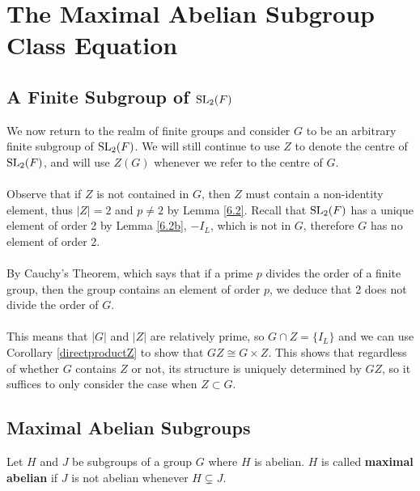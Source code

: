 \chapter[The Maximal Abelian Subgroup Class Equation]{The Maximal Abelian Subgroup Class Equation}\label{Ch6_MaximalAbelianSubgroupClassEquation}

\section[A finite subgroup of $\SL_2(F)$]{A Finite Subgroup of $\SL_2(F)$}

We now return to the realm of finite groups and consider $G$ to be an arbitrary finite subgroup of $\SL_2(F)$. We will still continue to use $Z$ to denote the centre of $\SL_2(F)$, and will use $Z(G)$ whenever we refer to the centre of $G$. \\
\\
Observe that if $Z$ is not contained in $G$, then $Z$ must contain a non-identity element, thus $|Z| = 2$ and $p \neq 2$ by Lemma \ref{6.2}. Recall that $\SL_2(F)$ has a unique element of order 2 by Lemma \ref{6.2b}, $- I_L$, which is not in $G$, therefore $G$ has no element of order 2. \\
\\
By Cauchy's Theorem, which says that if a prime $p$ divides the order of a finite group, then the group contains an element of order $p$, we deduce that 2 does not divide the order of $G$. \\
\\
This means that $|G|$ and $|Z|$ are relatively prime, so $G \cap Z = \{ I_L \}$ and we can use Corollary \ref{directproductZ} to show that $GZ \cong G \times Z$. This shows that regardless of whether $G$ contains $Z$ or not, its structure is uniquely determined by $GZ$, so it suffices to only consider the case when $Z \subset G$. 

\section{Maximal Abelian Subgroups}

\begin{definition}
\label{IsMaximalAbelian}
\leanok
Let $H$ and $J$ be subgroups of a group $G$ where $H$ is abelian. $H$ is called \textbf{maximal abelian} if $J$ is not abelian whenever $H \subsetneq J$.
\end{definition}

